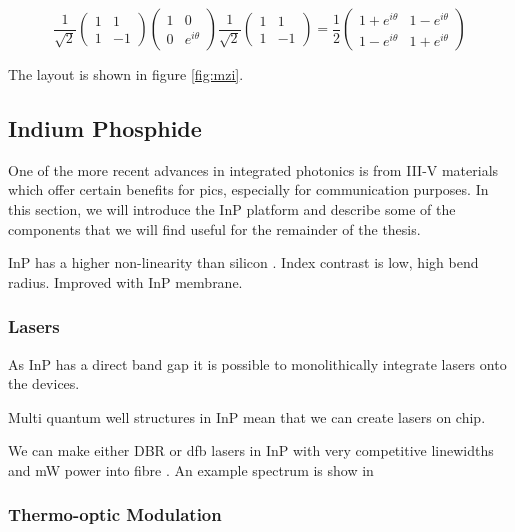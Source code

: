 \begin{equation}
	\frac{1}{\sqrt{2}}\left(
	\begin{matrix}
	1 & 1\\
	1 & -1
	\end{matrix}
	\right)
	\left(
	\begin{matrix}
	1 & 0\\
	0 & e^{i\theta}
	\end{matrix}
	\right)
	\frac{1}{\sqrt{2}}\left(
	\begin{matrix}
	1 & 1\\
	1 & -1
	\end{matrix}
	\right)=
	\frac{1}{2}\left(
	\begin{matrix}
	1 + e^{i\theta} & 1 -  e^{i\theta}\\
	1 -  e^{i\theta} & 1 +  e^{i\theta}
	\end{matrix}
	\right)
\end{equation}

The layout is shown in figure \ref{fig:mzi}.

\subsection{Indium Phosphide}

One of the more recent advances in integrated photonics is from III-V materials which offer certain benefits for \acp{pic}, especially for communication purposes. In this section, we will introduce the \acl{InP} platform and describe some of the components that we will find useful for the remainder of the thesis.

\Ac{InP} has a higher non-linearity than silicon \cite{Kumar2019}. Index contrast is low, high bend radius. Improved with InP membrane.

\subsubsection*{Lasers}

As \ac{InP} has a direct band gap it is possible to monolithically integrate lasers onto the devices. 

Multi quantum well structures in \ac{InP} mean that we can create lasers on chip.

We can make either \ac{DBR} or \ac{dfb} lasers in \ac{InP} with very competitive linewidths and mW power into fibre \cite{smit2014, jeppix}. An example spectrum is show in 

\subsubsection*{Thermo-optic Modulation}

